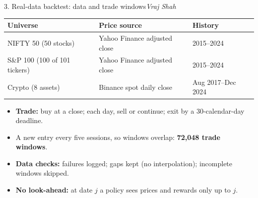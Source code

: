 \documentclass[aspectratio=169,11pt]{beamer}
\newcommand{\by}[1]{\hfill{\normalfont\small\itshape #1}}
\begin{document}
\begin{frame}{3. Real-data backtest: data and trade windows\by{Vraj Shah}}
\centering\small
\begin{tabular}{lll}
\toprule
Universe & Price source & History\\
\midrule
NIFTY 50 (50 stocks) & Yahoo Finance adjusted close & 2015--2024\\
S\&P 100 (100 of 101 tickers) & Yahoo Finance adjusted close & 2015--2024\\
Crypto (8 assets) & Binance spot daily close & Aug 2017--Dec 2024\\
\bottomrule
\end{tabular}

\vspace{8pt}\raggedright
\begin{itemize}\small
\item \textbf{Trade:} buy at a close; each day, sell or continue; exit by a 30-calendar-day deadline.
\item A new entry every five sessions, so windows overlap: \textbf{72{,}048 trade windows}.
\item \textbf{Data checks:} failures logged; gaps kept (no interpolation); incomplete windows skipped.
\item \textbf{No look-ahead:} at date $j$ a policy sees prices and rewards only up to $j$.
\end{itemize}
\end{frame}
\end{document}
